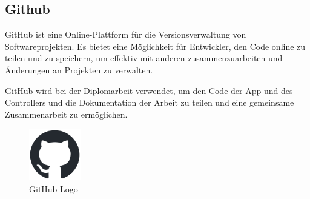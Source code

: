 \subsection{Github}
\label{sec:github}

GitHub ist eine Online-Plattform für die Versionsverwaltung von Softwareprojekten. Es bietet eine Möglichkeit für Entwickler, den Code online zu teilen und zu speichern, um effektiv mit anderen zusammenzuarbeiten und Änderungen an Projekten zu verwalten. 

\noindent GitHub wird bei der Diplomarbeit verwendet, um den Code der App und des Controllers und die Dokumentation der Arbeit zu teilen und eine gemeinsame Zusammenarbeit zu ermöglichen.

\begin{figure}[H]
    \centering
    \includegraphics[width=0.2\textwidth]{images/github-mark.png}
    \caption{GitHub Logo }
    \label{fig:githublogo}
\end{figure}